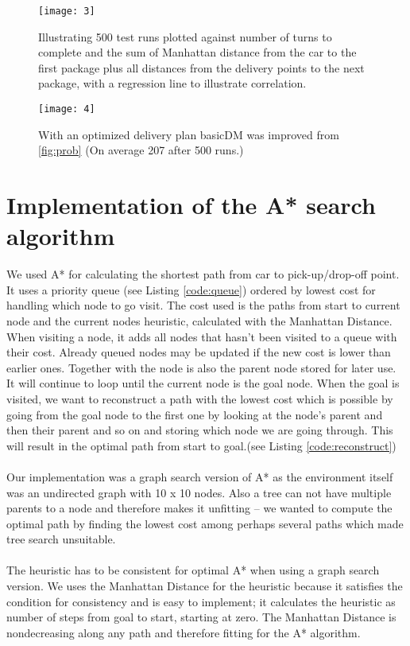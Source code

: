 \documentclass[a4paper]{article}
\begin{document}
\begin{figure}[h]
  \centering
    \texttt{[image: 3]}
    \caption{Illustrating 500 test runs plotted against number of turns to complete and the sum of Manhattan distance from the car to the first package plus all distances from the delivery points to the next package, with a regression line to illustrate correlation.}
    \label{fig:manhattan}
\end{figure}

\begin{figure}[H]
  \centering
    \texttt{[image: 4]}
    \caption{With an optimized delivery plan basicDM was improved from \ref{fig:prob} (On average 207 after 500 runs.)}
    \label{fig:basic}
\end{figure}

\section{Implementation of the A* search algorithm}
We used A* for calculating the shortest path from car to pick-up/drop-off point. It uses a priority queue (see Listing \ref{code:queue}) ordered by lowest cost for handling which node to go visit. The cost used is the paths from start to current node and the current nodes heuristic, calculated with the Manhattan Distance. When visiting a node, it adds all nodes that hasn't been visited to a queue with their cost. Already queued nodes may be updated if the new cost is lower than earlier ones. Together with the node is also the parent node stored for later use. It will continue to loop until the current node is the goal node. When the goal is visited, we want to reconstruct a path with the lowest cost which is possible by going from the goal node to the first one by looking at the node's parent and then their parent and so on and storing which node we are going through. This will result in the optimal path from start to goal.(see Listing \ref{code:reconstruct})\\
\\
Our implementation was a graph search version of A* as the environment itself was an undirected graph with 10 x 10 nodes. Also a tree can not have multiple parents to a node and therefore makes it unfitting – we wanted to compute the optimal path by finding the lowest cost among perhaps several paths which made tree search unsuitable.\\
\\
The heuristic has to be consistent for optimal A* when using a graph search version.\cite[p.~95]{ai} We uses the Manhattan Distance for the heuristic because it satisfies the condition for consistency and is easy to implement; it calculates the heuristic as number of steps from goal to start, starting at zero. The Manhattan Distance is nondecreasing along any path and therefore fitting for the A* algorithm.
\end{document}
